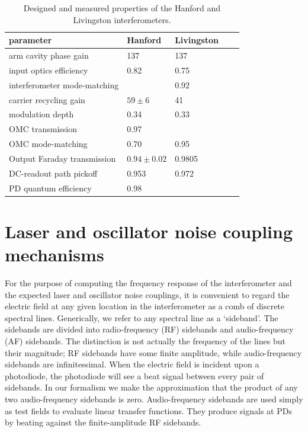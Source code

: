 \begin{table}
\centering
\begin{tabular}{l l l l l}
\hline 
\textbf{parameter}          &\textbf{Hanford}&\textbf{Livingston}  \\
\hline
arm cavity phase gain       & 137            & 137         \\
input optics efficiency     & 0.82           & 0.75        \\
interferometer mode-matching&                & 0.92        \\
carrier recycling gain      & $59\pm6$       & 41          \\
modulation depth            & 0.34           & 0.33        \\
OMC transmission            & 0.97           &             \\
OMC mode-matching           & 0.70           & 0.95        \\
Output Faraday transmission & $0.94\pm0.02$  & 0.9805      \\
DC-readout path pickoff     & 0.953          & 0.972       \\
PD quantum efficiency       & 0.98           &             \\
\hline
\end{tabular}
\caption[Interferometer properties (designed and measured)]{Designed and measured properties of the Hanford and Livingston interferometers.}
\label{tab:ifo-properties}
\end{table}


\section{Laser and oscillator noise coupling mechanisms}

For the purpose of computing the frequency response of the interferometer and
the expected laser and oscillator noise couplings, it is convenient to regard
the electric field at any given location in the interferometer as a comb of
discrete spectral lines.  Generically, we refer to any spectral line as a
`sideband'.  The sidebands are divided into radio-frequency (RF) sidebands and
audio-frequency (AF) sidebands. The distinction is not actually the frequency of
the lines but their magnitude; RF sidebands have some finite amplitude, while
audio-frequency sidebands are infinitessimal.  When the electric field is
incident upon a photodiode, the photodiode will see a beat signal between every
pair of sidebands.  In our formalism we make the approximation that the product
of any two audio-frequency sidebands is zero.  Audio-frequency sidebands are
used simply as test fields to evaluate linear transfer functions.  They produce
signals at PDs by beating against the finite-amplitude RF sidebands.


